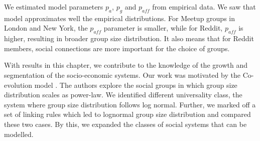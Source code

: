 We estimated model parameters $p_a$, $p_g$ and $p_{aff}$ from empirical data. We saw that model approximates well the empirical distributions. For Meetup groups in London and New York, the $p_{aff}$ parameter is smaller, while for Reddit, $p_{aff}$ is higher, resulting in broader group size distribution. It also means that for Reddit members, social connections are more important for the choice of groups. %

With results in this chapter, we contribute to the knowledge of the growth and segmentation of the socio-economic systems. Our work was motivated by the Co-evolution model \cite{zheleva2009co}. The authors explore the social groups in which group size distribution scales as power-law. We identified different universality class, the system where group size distribution follows log normal. Further, we marked off a set of linking rules which led to lognormal group size distribution and compared these two cases. By this, we expanded the classes of social systems that can be modelled.  









